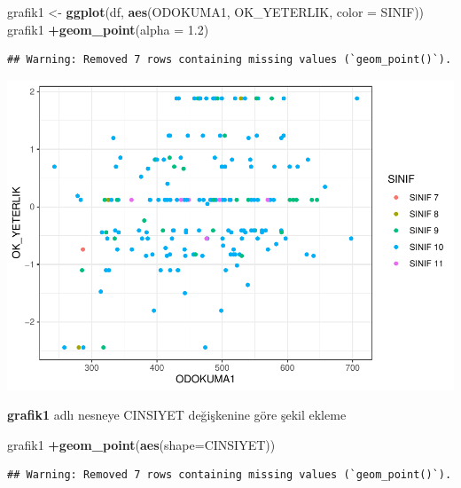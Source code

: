 \documentclass[
  oneside]{book}
\newenvironment{Shaded}{\begin{snugshade}}{\end{snugshade}}
\newcommand{\AttributeTok}[1]{\textcolor[rgb]{0.13,0.29,0.53}{#1}}
\newcommand{\FloatTok}[1]{\textcolor[rgb]{0.00,0.00,0.81}{#1}}
\newcommand{\FunctionTok}[1]{\textcolor[rgb]{0.13,0.29,0.53}{\textbf{#1}}}
\newcommand{\NormalTok}[1]{#1}
\newcommand{\OtherTok}[1]{\textcolor[rgb]{0.56,0.35,0.01}{#1}}
\newcommand{\SpecialCharTok}[1]{\textcolor[rgb]{0.81,0.36,0.00}{\textbf{#1}}}
\begin{document}
\begin{Shaded}
\begin{Highlighting}[]
\NormalTok{grafik1 }\OtherTok{\textless{}{-}} \FunctionTok{ggplot}\NormalTok{(df, }\FunctionTok{aes}\NormalTok{(ODOKUMA1, OK\_YETERLIK, }\AttributeTok{color =}\NormalTok{ SINIF))}
\NormalTok{grafik1 }\SpecialCharTok{+}\FunctionTok{geom\_point}\NormalTok{(}\AttributeTok{alpha =} \FloatTok{1.2}\NormalTok{)}
\end{Highlighting}
\end{Shaded}

\begin{verbatim}
## Warning: Removed 7 rows containing missing values (`geom_point()`).
\end{verbatim}

\begin{center}\includegraphics[width=1\linewidth]{15-betimleyici-istatistik_files/figure-latex/unnamed-chunk-48-1} \end{center}

\textbf{grafik1} adlı nesneye CINSIYET değişkenine göre şekil ekleme

\begin{Shaded}
\begin{Highlighting}[]
\NormalTok{grafik1 }\SpecialCharTok{+}\FunctionTok{geom\_point}\NormalTok{(}\FunctionTok{aes}\NormalTok{(}\AttributeTok{shape=}\NormalTok{CINSIYET))}
\end{Highlighting}
\end{Shaded}

\begin{verbatim}
## Warning: Removed 7 rows containing missing values (`geom_point()`).
\end{verbatim}
\end{document}

